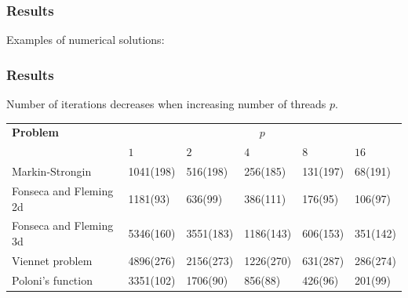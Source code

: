 \documentclass[aspectratio=1610]{beamer}
\begin{document}
\begin{frame}
  \frametitle{Results}
  Examples of numerical solutions:
  \begin{figure}[ht]
      \centering
  \end{figure}
\end{frame}

\begin{frame}
  \frametitle{Results}

  Number of iterations decreases when increasing number of threads \(p\).
  \begin{table}
    \centering
    \begin{tabular}{|l|p{1.5cm}|p{1.5cm}|p{1.5cm}|p{1.5cm}|p{1.5cm}|}
  \hline
  \textbf{Problem} & \multicolumn{5}{c|}{\(p\)}\\
  \cline{2-6}
    & \(1\) & \(2\) & \(4\) & \(8\) & \(16\)\\
  \hline
  Markin-Strongin & 1041(198) & 516(198) & 256(185) & 131(197) & 68(191) \\
  \hline
  Fonseca and Fleming 2d & 1181(93) & 636(99) & 386(111) & 176(95) & 106(97) \\
  \hline
  Fonseca and Fleming 3d & 5346(160) & 3551(183) & 1186(143) & 606(153) & 351(142) \\
  \hline
  Viennet problem & 4896(276) & 2156(273) & 1226(270) & 631(287) & 286(274)\\
  \hline
  Poloni's function & 3351(102) & 1706(90) & 856(88) & 426(96) & 201(99) \\
  \hline
  \end{tabular}
  \end{table}

\end{frame}
\end{document}
